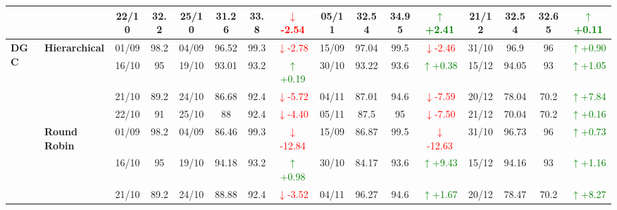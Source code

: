 {\begin{longtable}{llcc|cccc|cccc|cccc}
&
& 22/10 & 32.2 & 25/10 & 31.26 & 33.8 & \textcolor{red}{\(\downarrow\)-2.54} & 05/11 & 32.54 & 34.95 & \textcolor{green}{\(\uparrow\)+2.41} & 21/12 & 32.54 & 32.65 & \textcolor{green}{\(\uparrow\)+0.11} \\
\midrule




\multirow{12}{*}{\textbf{DGC}} 
& \textbf{Hierarchical}
& 01/09 & 98.2 & 04/09 & 96.52 & 99.3 & \textcolor{red}{\(\downarrow\)-2.78} & 15/09 & 97.04 & 99.5 & \textcolor{red}{\(\downarrow\)-2.46} & 31/10 & 96.9 & 96 & \textcolor{green}{\(\uparrow\)+0.90} \\

&
& 16/10 & 95 & 19/10 & 93.01 & 93.2 & \textcolor{green}{\(\uparrow\)+0.19} & 30/10 & 93.22 & 93.6 & \textcolor{green}{\(\uparrow\)+0.38} & 15/12 & 94.05 & 93 & \textcolor{green}{\(\uparrow\)+1.05} \\

&
& 21/10 & 89.2 & 24/10 & 86.68 & 92.4 & \textcolor{red}{\(\downarrow\)-5.72} & 04/11 & 87.01 & 94.6 & \textcolor{red}{\(\downarrow\)-7.59} & 20/12 & 78.04 & 70.2 & \textcolor{green}{\(\uparrow\)+7.84} \\

&
& 22/10 & 91 & 25/10 & 88 & 92.4 & \textcolor{red}{\(\downarrow\)-4.40} & 05/11 & 87.5 & 95 & \textcolor{red}{\(\downarrow\)-7.50} & 21/12 & 70.04 & 70.2 & \textcolor{green}{\(\uparrow\)+0.16} \\
\cmidrule(lr){2-16}


& \textbf{Round Robin}
& 01/09 & 98.2 & 04/09 & 86.46 & 99.3 & \textcolor{red}{\(\downarrow\)-12.84} & 15/09 & 86.87 & 99.5 & \textcolor{red}{\(\downarrow\)-12.63} & 31/10 & 96.73 & 96 & \textcolor{green}{\(\uparrow\)+0.73} \\

&
& 16/10 & 95 & 19/10 & 94.18 & 93.2 & \textcolor{green}{\(\uparrow\)+0.98} & 30/10 & 84.17 & 93.6 & \textcolor{green}{\(\uparrow\)+9.43} & 15/12 & 94.16 & 93 & \textcolor{green}{\(\uparrow\)+1.16} \\

&
& 21/10 & 89.2 & 24/10 & 88.88 & 92.4 & \textcolor{red}{\(\downarrow\)-3.52} & 04/11 & 96.27 & 94.6 & \textcolor{green}{\(\uparrow\)+1.67} & 20/12 & 78.47 & 70.2 & \textcolor{green}{\(\uparrow\)+8.27} \\


\end{longtable}}
